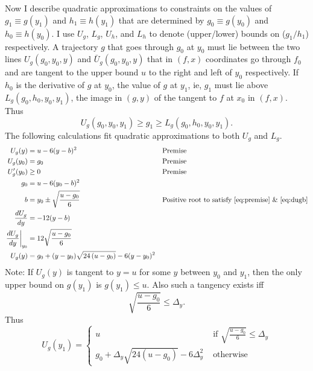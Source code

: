 \documentclass[]{article}
\begin{document}
Now I describe quadratic approximations to constraints on the values
of $g_1 \equiv g(y_1)$ and $h_1 \equiv h(y_1)$ that are determined by
$g_0 \equiv g(y_0)$ and $h_0 \equiv h(y_0)$.  I use $U_g$, $L_g$,
$U_h$, and $L_h$ to denote (upper/lower) bounds on ($g_1/h_1$)
respectively.  A trajectory $g$ that goes through $g_0$ at $y_0$ must
lie between the two lines $U_g(g_0,y_0,y)$ and $\bar U_g(g_0,y_0,y)$
that in $(f,x)$ coordinates go through $f_0$ and are tangent to the
upper bound $u$ to the right and left of $y_0$ respectively.  If $h_0$
is the derivative of $g$ at $y_0$, the value of $g$ at $y_1$, ie,
$g_1$ must lie above $L_g(g_0,h_0,y_0, y_1)$, the image in $(g,y)$ of
the tangent to $f$ at $x_0$ in $(f,x)$.  Thus
\begin{equation}
  \label{eq:boundsA}
  U_g(g_0,y_0, y_1) \geq g_1 \geq L_g(g_0,h_0,y_0, y_1).
\end{equation}
The following calculations fit quadratic approximations to both $U_g$
and $L_g$.
\newcommand{\Rad}[1]{\sqrt{24\left(u#1\right)}}
\newcommand{\UgQ}{ g_0 + \Delta_y\Rad{-g_0} - 6 \Delta_y^2}
\begin{align}
  U_g(y) &= u - 6(y-b)^2 &&\text{Premise} \nonumber \\
  U_g(y_0) &= g_0 &&\text{Premise} \nonumber \\
  \label{eq:premise}
  U'_g(y_0) &\geq 0 &&\text{Premise} \\
  g_0 &= u - 6(y_0-b)^2 \nonumber \\
  b &= y_0 \pm \sqrt{\frac{u-g_0}{6}} && \text{Positive root to satisfy
    \eqref{eq:premise} \& \eqref{eq:dugb}}  \nonumber \\
  \label{eq:dugb}
  \frac{d U_g}{d y} &= -12(y-b) \\
  \label{eq:dug}
  \left. \frac{d U_g}{d y} \right|_{y_0} &= 12\sqrt{\frac{u-g_0}{6}} \\
  U_g(y) &= g_0 + (y-y_0)\Rad{-g_0} - 6 (y-y_0)^2 \nonumber
\end{align}
Note: If $U_g(y)$ is tangent to $y=u$ for some $y$ between $y_0$ and
$y_1$, then the only upper bound on $g(y_1)$ is $g(y_1)\leq u$.  Also
such a tangency exists iff
\begin{equation*}
  \sqrt{\frac{u-g_0}{6}} \leq \Delta_y.
\end{equation*}
Thus
\begin{equation*}
  U_g(y_1) =
  \begin{cases}
    u & \text{ if } \sqrt{\frac{u-g_0}{6}} \leq \Delta_y\\
    \UgQ & \text{ otherwise}
  \end{cases}
\end{equation*}
\end{document}
